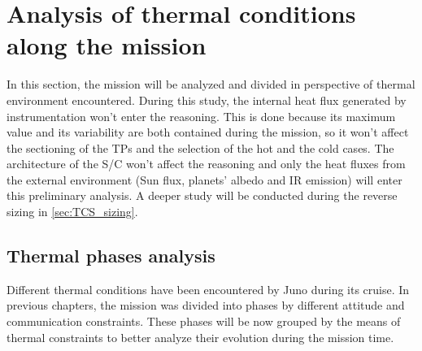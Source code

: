 \section{Analysis of thermal conditions along the mission}
\label{sec:TCS_phases}

In this section, the mission will be analyzed and divided in perspective of thermal environment encountered. During this study, the internal heat flux generated by instrumentation won't enter the reasoning.
This is done because its maximum value and its variability are both contained during the mission, so it won't affect the sectioning of the TPs and the selection of the hot and the cold cases.
The architecture of the S/C won't affect the reasoning and only the heat fluxes from the external environment (Sun flux, planets' albedo and IR emission) will enter this preliminary analysis. A deeper study will be conducted during the reverse sizing in \autoref{sec:TCS_sizing}.

\subsection{Thermal phases analysis}
\label{subsec:TP_analysis}

Different thermal conditions have been encountered by Juno during its cruise. In previous chapters, the mission was divided into phases by different attitude and communication constraints.
These phases will be now grouped by the means of thermal constraints to better analyze their evolution during the mission time.

